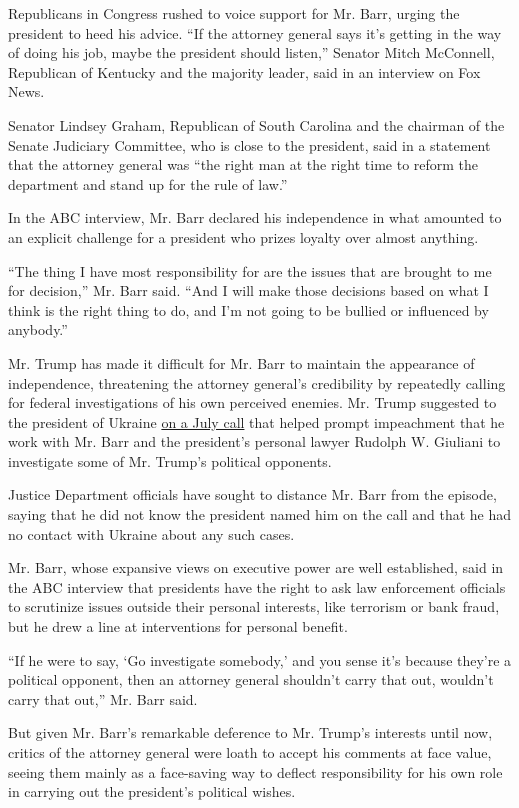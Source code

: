 Republicans in Congress rushed to voice support for Mr. Barr, urging the
president to heed his advice. ``If the attorney general says it's
getting in the way of doing his job, maybe the president should
listen,'' Senator Mitch McConnell, Republican of Kentucky and the
majority leader, said in an interview on Fox News.

Senator Lindsey Graham, Republican of South Carolina and the chairman of
the Senate Judiciary Committee, who is close to the president, said in a
statement that the attorney general was ``the right man at the right
time to reform the department and stand up for the rule of law.''

In the ABC interview, Mr. Barr declared his independence in what
amounted to an explicit challenge for a president who prizes loyalty
over almost anything.

``The thing I have most responsibility for are the issues that are
brought to me for decision,'' Mr. Barr said. ``And I will make those
decisions based on what I think is the right thing to do, and I'm not
going to be bullied or influenced by anybody.''

Mr. Trump has made it difficult for Mr. Barr to maintain the appearance
of independence, threatening the attorney general's credibility by
repeatedly calling for federal investigations of his own perceived
enemies. Mr. Trump suggested to the president of Ukraine
\href{https://www.nytimes3xbfgragh.onion/2019/09/25/us/politics/donald-trump-impeachment-probe.html}{on
a July call} that helped prompt impeachment that he work with Mr. Barr
and the president's personal lawyer Rudolph W. Giuliani to investigate
some of Mr. Trump's political opponents.

Justice Department officials have sought to distance Mr. Barr from the
episode, saying that he did not know the president named him on the call
and that he had no contact with Ukraine about any such cases.

Mr. Barr, whose expansive views on executive power are well established,
said in the ABC interview that presidents have the right to ask law
enforcement officials to scrutinize issues outside their personal
interests, like terrorism or bank fraud, but he drew a line at
interventions for personal benefit.

``If he were to say, `Go investigate somebody,' and you sense it's
because they're a political opponent, then an attorney general shouldn't
carry that out, wouldn't carry that out,'' Mr. Barr said.

But given Mr. Barr's remarkable deference to Mr. Trump's interests until
now, critics of the attorney general were loath to accept his comments
at face value, seeing them mainly as a face-saving way to deflect
responsibility for his own role in carrying out the president's
political wishes.

